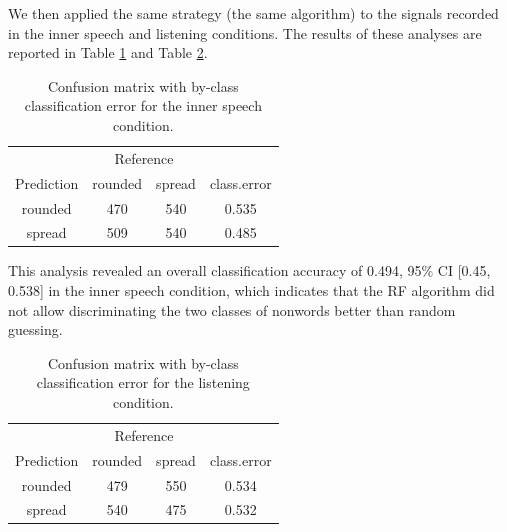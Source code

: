 \documentclass[a4paper,12pt,twoside,onecolumn,openright,final,oldfontcommands]{memoir}
\begin{document}
We then applied the same strategy (the same algorithm) to the signals recorded in the inner speech and listening conditions. The results of these analyses are reported in Table \ref{tab:CMinner} and Table \ref{tab:CMlistening}.

\begin{table}[H]
\begin{center}
\begin{threeparttable}
\caption{\label{tab:CMinner}Confusion matrix with by-class classification error for the inner speech condition.}
\begin{tabular}{cccc}
\toprule
 & \multicolumn{2}{c}{Reference}  &\\
\cmidrule(r){2-3}
Prediction & \multicolumn{1}{c}{rounded} & \multicolumn{1}{c}{spread} & \multicolumn{1}{c}{class.error}\\
\midrule
rounded & 470 & 540 & 0.535\\
spread & 509 & 540 & 0.485\\
\bottomrule
\end{tabular}
\end{threeparttable}
\end{center}
\end{table}

This analysis revealed an overall classification accuracy of 0.494, 95\% CI {[}0.45, 0.538{]} in the inner speech condition, which indicates that the RF algorithm did not allow discriminating the two classes of nonwords better than random guessing.

\begin{table}[H]
\begin{center}
\begin{threeparttable}
\caption{\label{tab:CMlistening}Confusion matrix with by-class classification error for the listening condition.}
\begin{tabular}{cccc}
\toprule
 & \multicolumn{2}{c}{Reference}  &\\
\cmidrule(r){2-3}
Prediction & \multicolumn{1}{c}{rounded} & \multicolumn{1}{c}{spread} & \multicolumn{1}{c}{class.error}\\
\midrule
rounded & 479 & 550 & 0.534\\
spread & 540 & 475 & 0.532\\
\bottomrule
\end{tabular}
\end{threeparttable}
\end{center}
\end{table}
\end{document}
